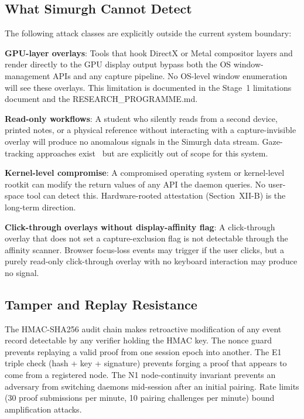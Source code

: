 \documentclass[conference]{IEEEtran}
\begin{document}
\subsection{What Simurgh Cannot Detect}

The following attack classes are explicitly outside the current system boundary:

\textbf{GPU-layer overlays}: Tools that hook DirectX or Metal compositor layers and render directly to the GPU display output bypass both the OS window-management APIs and any capture pipeline. No OS-level window enumeration will see these overlays. This limitation is documented in the Stage~1 limitations document and the RESEARCH\_PROGRAMME.md.

\textbf{Read-only workflows}: A student who silently reads from a second device, printed notes, or a physical reference without interacting with a capture-invisible overlay will produce no anomalous signals in the Simurgh data stream. Gaze-tracking approaches exist~\cite{kaddoura2023computational,ferdosi2023modeling} but are explicitly out of scope for this system.

\textbf{Kernel-level compromise}: A compromised operating system or kernel-level rootkit can modify the return values of any API the daemon queries. No user-space tool can detect this. Hardware-rooted attestation (Section~XII-B) is the long-term direction.

\textbf{Click-through overlays without display-affinity flag}: A click-through overlay that does not set a capture-exclusion flag is not detectable through the affinity scanner. Browser focus-loss events may trigger if the user clicks, but a purely read-only click-through overlay with no keyboard interaction may produce no signal.

\subsection{Tamper and Replay Resistance}

The HMAC-SHA256 audit chain makes retroactive modification of any event record detectable by any verifier holding the HMAC key. The nonce guard prevents replaying a valid proof from one session epoch into another. The E1 triple check (hash + key + signature) prevents forging a proof that appears to come from a registered node. The N1 node-continuity invariant prevents an adversary from switching daemons mid-session after an initial pairing. Rate limits (30 proof submissions per minute, 10 pairing challenges per minute) bound amplification attacks.
\end{document}

